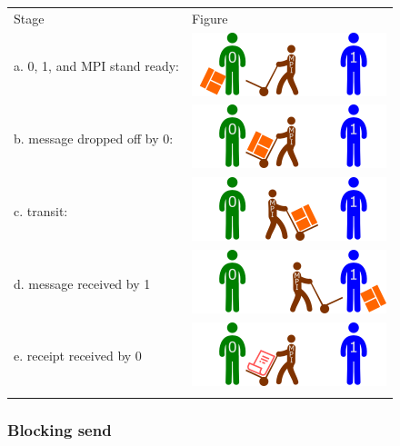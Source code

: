 \begin{longtable}[c]{@{}ll@{}}
\toprule\addlinespace
Stage & Figure
\\\addlinespace
\midrule\endhead
a. 0, 1, and MPI stand ready: &
\includegraphics{06MPI/figures/sync0.png}
\\\addlinespace
b. message dropped off by 0: & \includegraphics{06MPI/figures/sync1.png}
\\\addlinespace
c. transit: & \includegraphics{06MPI/figures/syncT.png}
\\\addlinespace
d. message received by 1 & \includegraphics{06MPI/figures/syncA.png}
\\\addlinespace
e. receipt received by 0 & \includegraphics{06MPI/figures/syncR.png}
\\\addlinespace
\bottomrule
\end{longtable}

\subsubsection{Blocking send}\label{blocking-send}

